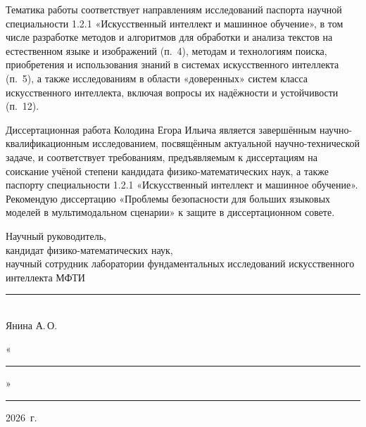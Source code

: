 \documentclass[14pt,a4paper]{extarticle}
\begin{document}
Тематика работы соответствует направлениям исследований паспорта научной специальности 1.2.1 «Искусственный интеллект и машинное обучение», в том числе разработке методов и алгоритмов для обработки и анализа текстов на естественном языке и изображений (п.~4), методам и технологиям поиска, приобретения и использования знаний в системах искусственного интеллекта (п.~5), а также исследованиям в области «доверенных» систем класса искусственного интеллекта, включая вопросы их надёжности и устойчивости (п.~12).

Диссертационная работа Колодина Егора Ильича является завершённым научно-квалификационным исследованием, посвящённым актуальной научно-технической задаче, и соответствует требованиям, предъявляемым к диссертациям на соискание учёной степени кандидата физико-математических наук, а также паспорту специальности 1.2.1 «Искусственный интеллект и машинное обучение». Рекомендую диссертацию «Проблемы безопасности для больших языковых моделей в мультимодальном сценарии» к защите в диссертационном совете.

\vspace{2.5em}

\noindent
\begin{minipage}{0.55\textwidth}
Научный руководитель,\\
кандидат физико-математических наук,\\
научный сотрудник лаборатории фундаментальных исследований искусственного интеллекта МФТИ
\end{minipage}
\hfill
\begin{minipage}{0.4\textwidth}
\raggedleft
\rule{4cm}{0.4pt}\\
Янина А.\,О.

\medskip
«\rule{1cm}{0.4pt}» \rule{3cm}{0.4pt} 2026~г.
\end{minipage}
\end{document}
